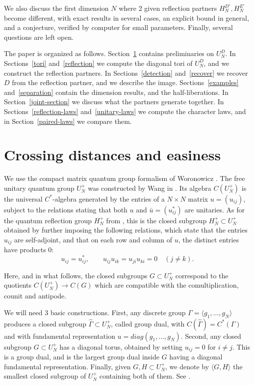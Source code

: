 \documentclass[11pt,a4paper]{article}
\begin{document}
We also discuss the first dimension $N$ where 2 given reflection partners $H_N^{D'},H_N^{E'}$ become different, with exact results in several cases, an explicit bound in general, and a conjecture, verified by computer for small parameters. Finally, several questions are left open.

The paper is organized as follows. Section~\ref{unitary} contains preliminaries on $U_N^D$. In Sections~\ref{tori} and~\ref{reflection} we compute the diagonal tori of $U_N^D$, and we construct the reflection partners. In Sections~\ref{detection} and~\ref{recover} we recover $D$ from the reflection partner, and we describe the image. Sections~\ref{examples} and~\ref{separation} contain the dimension results, and the half-liberations. In Section~\ref{joint-section} we discuss what the partners generate together. In Sections~\ref{reflection-laws} and~\ref{unitary-laws} we compute the character laws, and in Section~\ref{paired-laws} we compare them.

\section{Crossing distances and easiness}\label{unitary}

We use the compact matrix quantum group formalism of Woronowicz \cite{wor}. The free unitary quantum group $U_N^+$ was constructed by Wang in \cite{wang}. Its algebra $C(U_N^+)$ is the universal $C^*$-algebra generated by the entries of a $N\times N$ matrix $u=(u_{ij})$, subject to the relations stating that both $u$ and $\bar u=(u_{ij}^*)$ are unitaries. As for the quantum reflection group $H_N^+$ from \cite{bbc}, this is the closed subgroup $H_N^+\subset U_N^+$ obtained by further imposing the following relations, which state that the entries $u_{ij}$ are self-adjoint, and that on each row and column of $u$, the distinct entries have products $0$:
\[
 u_{ij}=u_{ij}^*,\qquad u_{ij}u_{ik}=u_{ji}u_{ki}=0\quad(j\neq k).
\]

Here, and in what follows, the closed subgroups $G\subset U_N^+$ correspond to the quotients $C(U_N^+)\to C(G)$ which are compatible with the comultiplication, counit and antipode.

We will need 3 basic constructions. First, any discrete group $\Gamma=\langle g_1,\ldots,g_N\rangle$ produces a closed subgroup $\widehat\Gamma\subset U_N^+$, called group dual, with $C(\widehat\Gamma)=C^*(\Gamma)$ and with fundamental representation $u=diag(g_1,\ldots,g_N)$. Second, any closed subgroup $G\subset U_N^+$ has a diagonal torus, obtained by setting $u_{ij}=0$ for $i\neq j$. This is a group dual, and is the largest group dual inside $G$ having a diagonal fundamental representation. Finally, given $G,H\subset U_N^+$, we denote by $\langle G,H\rangle$ the smallest closed subgroup of $U_N^+$ containing both of them. See \cite{bcf,chir}.
\end{document}

